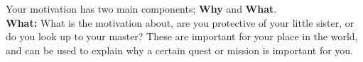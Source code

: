 \begin{multicols}{2}

Your motivation has two main components; \textbf{Why} and \textbf{What}.\\

\textbf{What:} What is the motivation about, are you protective of your little sister, or do you look up to your master? These are important for your place in the world, and can be used to explain why a certain quest or mission is important for you.\\


\end{multicols}
